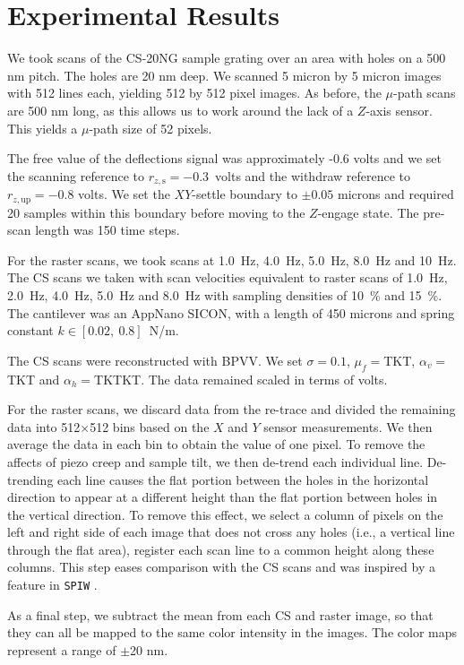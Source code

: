 \documentclass[twocolumn,oneside]{IEEEtran/IEEEtran}
\newcommand{\xc}{\ensuremath{X}\xspace}
\newcommand{\yc}{\ensuremath{Y}\xspace}
\newcommand{\rzup}{\ensuremath{r_{z,\textrm{up}}}\xspace}
\newcommand{\rzs}{\ensuremath{r_{z,\textrm{s}}}\xspace}
\begin{document}
\section{Experimental Results}\label{sec:results}
We took scans of the CS-20NG sample grating over an area with holes on a 500 nm
pitch. The holes are 20 nm deep.
We scanned 5 micron by 5 micron images with 512
lines each, yielding 512 by 512 pixel images. As before, the $\mu$-path scans
are 500 nm long, as this allows us to work around the lack of a $Z$-axis sensor.
This yields a $\mu$-path size of 52 pixels.

The free value of the deflections signal was approximately -0.6 volts and we set
the scanning reference to ${\rzs=-0.3}$~volts and the withdraw reference to
${\rzup=-0.8}$ volts. We set the $XY$-settle boundary to $\pm 0.05$
microns and required 20 samples within this boundary before moving to the
$Z$-engage state. The pre-scan length was 150 time steps.


For the raster scans, we took scans at 1.0~Hz, 4.0~Hz, 5.0~Hz, 8.0~Hz and
10~Hz.  The CS scans we taken with scan velocities equivalent to raster scans of 1.0~Hz,
2.0~Hz, 4.0~Hz, 5.0~Hz and 8.0~Hz with sampling densities of 10~\% and 15~\%.
The cantilever was an AppNano SICON, with a
length of 450 microns and spring constant $k\in[0.02,~0.8]$~N/m.

The CS scans were reconstructed with BPVV. We set
$\sigma = 0.1$, $\mu_f=$TKT, $\alpha_v=$TKT and $\alpha_h=$TKTKT. The data remained scaled in terms of volts.

For the raster scans, we discard data from the re-trace and divided the
remaining data into 512$\times$512 bins based on the \xc and \yc sensor
measurements. We then average the data in each bin to obtain the value of one
pixel. To remove the affects of piezo creep and sample tilt, we then de-trend
each individual line. De-trending each line causes the flat portion between the holes in the horizontal direction to appear at a different height than the flat portion between holes in the vertical direction. 
To remove this effect, we select a column of
pixels on the left and right side of each image that does not cross any holes
(i.e., a vertical line through the flat area), register each scan line to a
common height along these columns. This step eases comparison with the CS scans
and was inspired by a feature in \texttt{SPIW} \cite{spiw}.

As a final step, we subtract the mean from each CS and raster image, so that
they can all be mapped to the same color intensity in the images. The color maps
represent a range of $\pm$20 nm.
\end{document}
